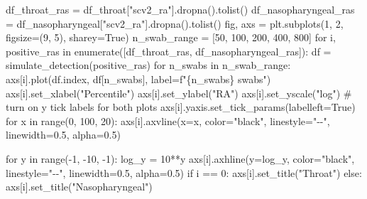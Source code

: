 \documentclass[
  letterpaper,
  DIV=11,
  numbers=noendperiod]{scrartcl}
\newenvironment{Shaded}{\begin{snugshade}}{\end{snugshade}}
\newcommand{\BuiltInTok}[1]{\textcolor[rgb]{0.00,0.23,0.31}{#1}}
\newcommand{\CommentTok}[1]{\textcolor[rgb]{0.37,0.37,0.37}{#1}}
\newcommand{\ControlFlowTok}[1]{\textcolor[rgb]{0.00,0.23,0.31}{#1}}
\newcommand{\DecValTok}[1]{\textcolor[rgb]{0.68,0.00,0.00}{#1}}
\newcommand{\FloatTok}[1]{\textcolor[rgb]{0.68,0.00,0.00}{#1}}
\newcommand{\KeywordTok}[1]{\textcolor[rgb]{0.00,0.23,0.31}{#1}}
\newcommand{\NormalTok}[1]{\textcolor[rgb]{0.00,0.23,0.31}{#1}}
\newcommand{\OperatorTok}[1]{\textcolor[rgb]{0.37,0.37,0.37}{#1}}
\newcommand{\SpecialCharTok}[1]{\textcolor[rgb]{0.37,0.37,0.37}{#1}}
\newcommand{\SpecialStringTok}[1]{\textcolor[rgb]{0.13,0.47,0.30}{#1}}
\newcommand{\StringTok}[1]{\textcolor[rgb]{0.13,0.47,0.30}{#1}}
\newcommand{\VariableTok}[1]{\textcolor[rgb]{0.07,0.07,0.07}{#1}}
\begin{document}
\begin{Shaded}
\begin{Highlighting}[]
\NormalTok{df\_throat\_ras }\OperatorTok{=}\NormalTok{ df\_throat[}\StringTok{"scv2\_ra"}\NormalTok{].dropna().tolist()}
\NormalTok{df\_nasopharyngeal\_ras }\OperatorTok{=}\NormalTok{ df\_nasopharyngeal[}\StringTok{"scv2\_ra"}\NormalTok{].dropna().tolist()}
\NormalTok{fig, axs }\OperatorTok{=}\NormalTok{ plt.subplots(}\DecValTok{1}\NormalTok{, }\DecValTok{2}\NormalTok{, figsize}\OperatorTok{=}\NormalTok{(}\DecValTok{9}\NormalTok{, }\DecValTok{5}\NormalTok{), sharey}\OperatorTok{=}\VariableTok{True}\NormalTok{)}
\NormalTok{n\_swab\_range }\OperatorTok{=}\NormalTok{ [}\DecValTok{50}\NormalTok{, }\DecValTok{100}\NormalTok{, }\DecValTok{200}\NormalTok{, }\DecValTok{400}\NormalTok{, }\DecValTok{800}\NormalTok{]}
\ControlFlowTok{for}\NormalTok{ i, positive\_ras }\KeywordTok{in} \BuiltInTok{enumerate}\NormalTok{([df\_throat\_ras, df\_nasopharyngeal\_ras]):}
\NormalTok{    df }\OperatorTok{=}\NormalTok{ simulate\_detection(positive\_ras)}
    \ControlFlowTok{for}\NormalTok{ n\_swabs }\KeywordTok{in}\NormalTok{ n\_swab\_range:}
\NormalTok{        axs[i].plot(df.index, df[n\_swabs], label}\OperatorTok{=}\SpecialStringTok{f"}\SpecialCharTok{\{}\NormalTok{n\_swabs}\SpecialCharTok{\}}\SpecialStringTok{ swabs"}\NormalTok{)}
\NormalTok{    axs[i].set\_xlabel(}\StringTok{"Percentile"}\NormalTok{)}
\NormalTok{    axs[i].set\_ylabel(}\StringTok{"RA"}\NormalTok{)}
\NormalTok{    axs[i].set\_yscale(}\StringTok{"log"}\NormalTok{)}
    \CommentTok{\# turn on y tick labels for both plots}
\NormalTok{    axs[i].yaxis.set\_tick\_params(labelleft}\OperatorTok{=}\VariableTok{True}\NormalTok{)}
    \ControlFlowTok{for}\NormalTok{ x }\KeywordTok{in} \BuiltInTok{range}\NormalTok{(}\DecValTok{0}\NormalTok{, }\DecValTok{100}\NormalTok{, }\DecValTok{20}\NormalTok{):}
\NormalTok{        axs[i].axvline(x}\OperatorTok{=}\NormalTok{x, color}\OperatorTok{=}\StringTok{"black"}\NormalTok{, linestyle}\OperatorTok{=}\StringTok{"{-}{-}"}\NormalTok{, linewidth}\OperatorTok{=}\FloatTok{0.5}\NormalTok{, alpha}\OperatorTok{=}\FloatTok{0.5}\NormalTok{)}

    \ControlFlowTok{for}\NormalTok{ y }\KeywordTok{in} \BuiltInTok{range}\NormalTok{(}\OperatorTok{{-}}\DecValTok{1}\NormalTok{, }\OperatorTok{{-}}\DecValTok{10}\NormalTok{, }\OperatorTok{{-}}\DecValTok{1}\NormalTok{):}
\NormalTok{        log\_y }\OperatorTok{=} \DecValTok{10}\OperatorTok{**}\NormalTok{y}
\NormalTok{        axs[i].axhline(y}\OperatorTok{=}\NormalTok{log\_y, color}\OperatorTok{=}\StringTok{"black"}\NormalTok{, linestyle}\OperatorTok{=}\StringTok{"{-}{-}"}\NormalTok{, linewidth}\OperatorTok{=}\FloatTok{0.5}\NormalTok{, alpha}\OperatorTok{=}\FloatTok{0.5}\NormalTok{)}
    \ControlFlowTok{if}\NormalTok{ i }\OperatorTok{==} \DecValTok{0}\NormalTok{:}
\NormalTok{        axs[i].set\_title(}\StringTok{"Throat"}\NormalTok{)}
    \ControlFlowTok{else}\NormalTok{:}
\NormalTok{        axs[i].set\_title(}\StringTok{"Nasopharyngeal"}\NormalTok{)}


\end{Highlighting}
\end{Shaded}
\end{document}
